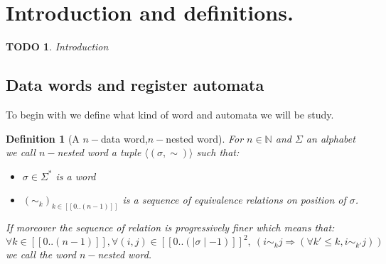 \documentclass[a4paper,10pt]{report}
\title{}
\author{}
\newtheorem{df}{Definition}
\newtheorem{td}{TODO}
\newcommand{\seg}[1]{[\![#1]\!]}
\newcommand{\segw}[1]{\seg{0..(\mid #1\mid -1)}}
\newcommand{\ts}{\seg{0 .. (n-1)}}
\begin{document}
\maketitle

\section{Introduction and definitions.}

\begin{td}
  Introduction
\end{td}

\subsection{Data words and register automata}

To begin with we define what kind of word and automata we will be study.

\begin{df}[A $n-$data word,$n-$nested word]
 For $n \in \mathbb{N}$ and $\Sigma$ an alphabet we call $n-$nested word a tuple  
 $\langle (\sigma , \sim )  \rangle$
 such that:
  \begin{itemize}
   \item $\sigma \in \Sigma^* $ is a word
   \item $(\sim_k)_{k \in \ts }$ is a sequence of equivalence relations on position of $\sigma$. 
  \end{itemize}
  If moreover the sequence of relation is progressively finer which means that:  
  $$\forall k \in \ts, \forall (i,j) \in \segw{\sigma}^2, \ (i \sim_k j \Rightarrow \left ( \forall k' \leq k, i \sim_{k'} j \right )) $$ 
   we call the word $n-$nested word.
\end{df}
\end{document}
